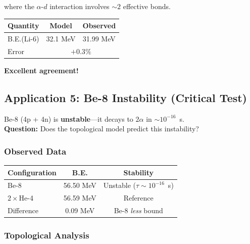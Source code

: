 where the $\alpha$-$d$ interaction involves $\sim 2$ effective bonds.

\begin{tcolorbox}[colback=green!5!white, colframe=green!75!black, title=Result: Li-6 Binding]
\begin{center}
\begin{tabular}{lcc}
\hline
Quantity & Model & Observed \\
\hline
B.E.(Li-6) & 32.1 MeV & 31.99 MeV \\
Error & \multicolumn{2}{c}{$+0.3\%$} \\
\hline
\end{tabular}
\end{center}
\textbf{Excellent agreement!}
\end{tcolorbox}

\subsection{Application 5: Be-8 Instability (Critical Test)}
\label{subsec:m6-be8}

\begin{tcolorbox}[colback=red!5!white, colframe=red!75!black, title=Critical Test: Be-8 Instability]
Be-8 (4p + 4n) is \textbf{unstable}—it decays to $2\alpha$ in $\sim 10^{-16}$~s. \\
\textbf{Question:} Does the topological model predict this instability?
\end{tcolorbox}

\subsubsection{Observed Data}

\begin{center}
\begin{tabular}{lcc}
\hline
Configuration & B.E. & Stability \\
\hline
Be-8 & 56.50 MeV & Unstable ($\tau \sim 10^{-16}$~s) \\
$2 \times$He-4 & 56.59 MeV & Reference \\
\hline
Difference & 0.09 MeV & Be-8 \emph{less} bound \\
\hline
\end{tabular}
\end{center}

\subsubsection{Topological Analysis}

